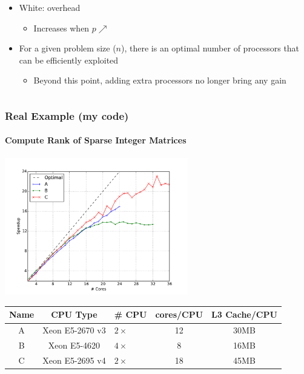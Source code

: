 \documentclass[xcolor={x11names,svgnames,psnames}]{beamer}
\begin{document}
\begin{frame}
\begin{columns}
\begin{column}{0.63\textwidth}
\begin{itemize}
        \medskip
        
      \item White: overhead
        \begin{itemize}
        \item Increases when $p \nearrow$
        \end{itemize}

        \medskip
        
      \item For a given problem size ($n$), there is an optimal number of processors that can be efficiently exploited
        \begin{itemize}
        \item Beyond this point, adding extra processors no longer bring any gain
        \end{itemize}
      \end{itemize}
    \end{column}
  \end{columns}  
\end{frame}


\begin{frame}
\frametitle{Real Example (my code)}
\framesubtitle{Compute Rank of Sparse Integer Matrices}

\centering
\includegraphics[height=6cm]{d19.pdf}

\medskip

\small
  \begin{tabular}{|c|c|l|c|c|}
\hline
Name & CPU Type        & \# CPU     & cores/CPU & L3 Cache/CPU\\
\hline\hline
A    & Xeon E5-2670 v3 & $2 \times$ & 12        & 30MB\\
\hline
B    & Xeon E5-4620    & $4 \times$ & 8         & 16MB\\
\hline
C    & Xeon E5-2695 v4 & $2 \times$ & 18        & 45MB\\
\hline
\end{tabular}



\end{frame}
\end{document}
